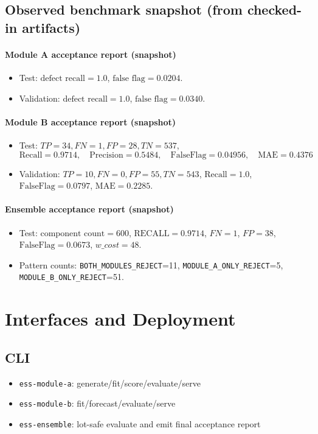 \documentclass[11pt]{article}
\begin{document}
\subsection{Observed benchmark snapshot (from checked-in artifacts)}
\paragraph{Module A acceptance report (snapshot)}
\begin{itemize}[nosep]
  \item Test: \(\text{defect recall}=1.0\), \(\text{false flag}=0.0204\).
  \item Validation: \(\text{defect recall}=1.0\), \(\text{false flag}=0.0340\).
\end{itemize}

\paragraph{Module B acceptance report (snapshot)}
\begin{itemize}[nosep]
  \item Test: \(TP=34, FN=1, FP=28, TN=537\),
  \[
  \mathrm{Recall}=0.9714,\quad \mathrm{Precision}=0.5484,\quad \mathrm{FalseFlag}=0.04956,\quad \mathrm{MAE}=0.4376
  \]
  \item Validation: \(TP=10, FN=0, FP=55, TN=543\), \(\mathrm{Recall}=1.0\), \(\mathrm{FalseFlag}=0.0797\), \(\mathrm{MAE}=0.2285\).
\end{itemize}

\paragraph{Ensemble acceptance report (snapshot)}
\begin{itemize}[nosep]
  \item Test: \(\text{component count}=600\), \(\text{RECALL}=0.9714\), \(FN=1\), \(FP=38\), \(\text{FalseFlag}=0.0673\), \(w\_cost=48\).
  \item Pattern counts: \texttt{BOTH\_MODULES\_REJECT}=11, \texttt{MODULE\_A\_ONLY\_REJECT}=5, \texttt{MODULE\_B\_ONLY\_REJECT}=51.
\end{itemize}

\section{Interfaces and Deployment}

\subsection{CLI}
\begin{itemize}[nosep]
  \item \texttt{ess-module-a}: generate/fit/score/evaluate/serve
  \item \texttt{ess-module-b}: fit/forecast/evaluate/serve
  \item \texttt{ess-ensemble}: lot-safe evaluate and emit final acceptance report
\end{itemize}
\end{document}
